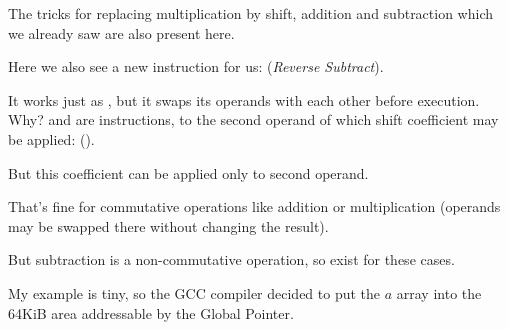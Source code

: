 The tricks for replacing multiplication by shift, addition and subtraction which we already saw
are also present here.

Here we also see a new instruction for us: \RSB (\emph{Reverse Subtract}).

It works just as \SUB, but it swaps its operands with each other before execution.
Why?
\SUB and \RSB  are instructions, to the second operand of which shift coefficient may be applied: (). 

But this coefficient can be applied only to second operand.

That's fine for commutative operations like addition or multiplication 
(operands may be swapped there without changing the result).

But subtraction is a non-commutative operation, so \RSB exist for these cases.


My example is tiny, so the GCC compiler decided to put the $a$ array into the 64KiB area 
addressable by the Global Pointer.



